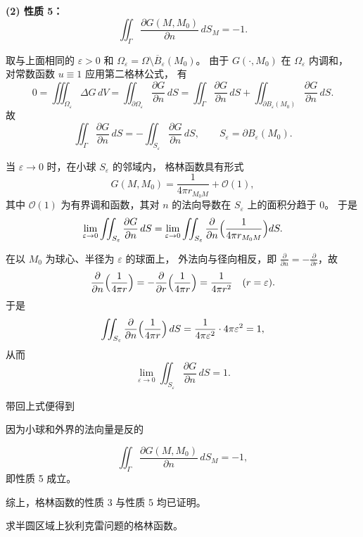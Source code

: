 \begin{solution}
    

\noindent\textbf{(2) 性质 5：}
\[
\displaystyle
\iint_{\Gamma}\frac{\partial G(M,M_0)}{\partial n}\,dS_M=-1.
\]

取与上面相同的 $\varepsilon>0$ 和
\(
\Omega_\varepsilon=\Omega\setminus \overline B_\varepsilon(M_0)
\)。
由于 $G(\cdot,M_0)$ 在 $\Omega_\varepsilon$ 内调和，
对常数函数 $u\equiv1$ 应用第二格林公式，
有
\[
0=\iiint_{\Omega_\varepsilon}\Delta G\,dV
   =\iint_{\partial\Omega_\varepsilon}\frac{\partial G}{\partial n}\,dS
   =\iint_{\Gamma}\frac{\partial G}{\partial n}\,dS
    +\iint_{\partial B_\varepsilon(M_0)}\frac{\partial G}{\partial n}\,dS .
\]
故
\[
\iint_{\Gamma}\frac{\partial G}{\partial n}\,dS
=-\iint_{S_\varepsilon}\frac{\partial G}{\partial n}\,dS ,
\qquad S_\varepsilon=\partial B_\varepsilon(M_0).
\]

当 $\varepsilon\to0$ 时，在小球 $S_\varepsilon$ 的邻域内，
格林函数具有形式
\[
G(M,M_0)=\frac1{4\pi r_{M_0M}} + \mathcal O(1),
\]
其中 $\mathcal O(1)$ 为有界调和函数，其对 $n$ 的法向导数在
$S_\varepsilon$ 上的面积分趋于 $0$。
于是
\[
\lim_{\varepsilon\to0}
\iint_{S_\varepsilon}\frac{\partial G}{\partial n}\,dS
=
\lim_{\varepsilon\to0}
\iint_{S_\varepsilon}
\frac{\partial}{\partial n}\Bigl(\frac1{4\pi r_{M_0M}}\Bigr) dS .
\]

在以 $M_0$ 为球心、半径为 $\varepsilon$ 的球面上，
外法向与径向相反，即
\(
\frac{\partial}{\partial n}=-\frac{\partial}{\partial r}
\)，故
\[
\frac{\partial}{\partial n}\Bigl(\frac1{4\pi r}\Bigr)
=-\frac{\partial}{\partial r}\Bigl(\frac1{4\pi r}\Bigr)
=\frac1{4\pi r^{2}}
\quad(r=\varepsilon).
\]
于是
\[
\iint_{S_\varepsilon}\frac{\partial}{\partial n}
\Bigl(\frac1{4\pi r}\Bigr)\,dS
=\frac1{4\pi\varepsilon^{2}}\cdot 4\pi\varepsilon^{2}=1,
\]
从而
\[
\lim_{\varepsilon\to0}
\iint_{S_\varepsilon}\frac{\partial G}{\partial n}\,dS = 1 .
\]

带回上式便得到\begin{dxtips}
    因为小球和外界的法向量是反的
\end{dxtips}
\[
\iint_{\Gamma}\frac{\partial G(M,M_0)}{\partial n}\,dS_M
=-1,
\]
即性质 5 成立。

\medskip
综上，格林函数的性质 3 与性质 5 均已证明。
\end{solution}
\begin{homework}[5]
求半圆区域上狄利克雷问题的格林函数。
\end{homework}

